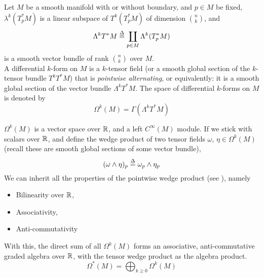 \documentclass[../main-manifolds.tex]{subfiles}
\begin{document}
    \begin{definition}
        Let $M$ be a smooth manifold with or without boundary, and $p\in M$ be fixed, $\lambda^k(T_p^*M)$ is a linear subspace of $T^k(T_p^*M)$ of dimension $\binom{n}{k}$, and
        \[
            \Lambda^kT^*M \overset{\Delta}{=} \coprod_{p\in M}\Lambda ^k(T^*_p M)
        \]
        is a smooth vector bundle of rank $\binom{n}{k}$ over $M$. \\

        A differential $k$-form on $M$ is a $k$-tensor field (or a smooth global section of the $k$-tensor bundle $T^kT^*M$) that is \emph{pointwise alternating}, or equivalently: it is a smooth global section of the vector bundle $\Lambda^kT^*M$. The space of differential $k$-forms on $M$ is denoted by 
        \[
            \Omega^k(M) = \Gamma(\Lambda^kT^*M)
        \]
    \end{definition}
    \begin{definition}
        $\Omega^k(M)$ is a vector space over $\mathbb{R}$, and a left $C^\infty(M)$ module. If we stick with scalars over $\mathbb{R}$, and define the wedge product of two tensor fields $\omega$, $\eta\in \Omega^k(M)$ (recall these are smooth global sections of some vector bundle),
        \[
            (\omega\wedge\eta)_p\overset{\Delta}{=} \omega_p\wedge\eta_p
        \]
        We can inherit all the properties of the pointwise wedge product (see ), namely \begin{itemize}
            \item Bilinearity over $\mathbb{R}$,
            \item Associativity,
            \item Anti-commutativity
        \end{itemize}
        With this, the direct sum of all $\Omega^k(M)$ forms an associative, anti-commutative graded algebra over $\mathbb{R}$, with the tensor wedge product as the algebra product.
        \[
            \Omega^*(M) = \bigoplus_{k\geq 0}\Omega^k(M)
        \]
    \end{definition}
    
\end{document}
